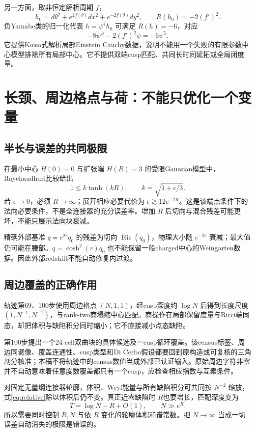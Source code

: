 \documentclass[UTF8,a4paper,11pt,fontset=fandol]{ctexart}
\numberwithin{equation}{section}
\theoremstyle{definition}
\newcommand{\Ric}{\operatorname{Ric}}
\begin{document}
另一方面，取非恒定解析周期 $f$，
\[
h_0=d\theta^2+e^{2f(\theta)}dx^2+e^{-2f(\theta)}dy^2,
\qquad R(h_0)=-2(f')^2.
\]
负Yamabe类的归一化代表 $h=\psi^4h_0$ 可满足 $R(h)=-6$，对应
\[
-8\psi''-2(f')^2\psi=-6\psi^5.
\]
它提供Koiso式解析局部Einstein Cauchy数据，说明不能用一个失败的有限参数中心模型排除所有局部中心。它不提供双端cusp匹配、共同长时间延拓或全局闭度量。

\section{长颈、周边格点与荷：不能只优化一个变量}
\subsection{半长与误差的共同极限}
在最小中心 $H(0)=0$ 与扩张端 $H(R)=3$ 的受限Gaussian模型中，Raychaudhuri比较给出
\[
1\le k\tanh(kR),\qquad k=\sqrt{1+\epsilon/3}.
\]
若 $\epsilon\to0$，必须 $R\to\infty$；展开相应必要代价为 $\epsilon\gtrsim12e^{-2R}$。这是该端点条件下的法向必要条件，不是全连接器的充分误差率。增加 $R$ 后切向与混合残差可能更坏，不能只展示法向块衰减。

精确外部基准 $q=e^{2r}q_0$ 的残差为切向 $\Ric(q_0)$，物理大小随 $e^{-2r}$ 衰减；最大值仍可能在腰部。$q=\cosh^2(r)q_0$ 也不能保留一般charged中心的Weingarten数据。因此外部redshift不能自动修复内过渡。

\subsection{周边覆盖的正确作用}
轨迹第69、100步使用周边格点 $(N,1,1)$，经cusp深度约 $\log N$ 后得到长度尺度 $(1,N^{-1},N^{-1})$，与rank-two商塌缩中心匹配。商操作在局部保留度量与Ricci端同态，却把体积与缺陷积分同时缩小；它不直接减小点态缺陷。

第100步提出一个24-cell双曲块的具体候选及一cusp循环覆盖。该census标签、周边同调像、覆盖连通性、cusp类型和Di Cerbo假设都要回到原构造或可复核的三角剖分核准；本稿不将轨迹中的census数值当成外部已认证输入。原始周边字符非零并不自动意味着任意度数覆盖都只有一个cusp，应检查相应指数与互素条件。

对固定无量纲连接器轮廓，体积、Weyl能量与所有缺陷积分可共同按 $N^{-2}$ 缩放，式\eqref{eq:relative}除以体积后仍不变。真正近零缺陷时 $R$也要增长，匹配深度变为
\begin{equation}\label{eq:RN}
T=\log N-R+O(1),\qquad N\gg e^R.
\end{equation}
所以需要同时控制 $R,N$ 与依 $R$ 变化的轮廓体积和谱常数。把 $N\to\infty$ 当成一切误差自动消失的极限是错误的。
\end{document}
